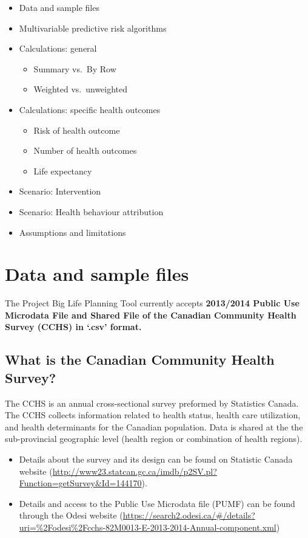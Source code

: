 \documentclass[]{book}
\providecommand{\tightlist}{%
  \setlength{\itemsep}{0pt}\setlength{\parskip}{0pt}}
\begin{document}
\begin{itemize}
\item
  Data and sample files
\item
  Multivariable predictive risk algorithms
\item
  Calculations: general

  \begin{itemize}
  \tightlist
  \item
    Summary vs.~By Row
  \item
    Weighted vs.~unweighted
  \end{itemize}
\item
  Calculations: specific health outcomes

  \begin{itemize}
  \tightlist
  \item
    Risk of health outcome
  \item
    Number of health outcomes
  \item
    Life expectancy
  \end{itemize}
\item
  Scenario: Intervention
\item
  Scenario: Health behaviour attribution
\item
  Assumptions and limitations
\end{itemize}

\section{Data and sample files}\label{data-and-sample-files}

The Project Big Life Planning Tool currently accepts \textbf{2013/2014
Public Use Microdata File and Shared File of the Canadian Community
Health Survey (CCHS) in `.csv' format.}

\subsection{What is the Canadian Community Health
Survey?}\label{what-is-the-canadian-community-health-survey}

The CCHS is an annual cross-sectional survey preformed by Statistics
Canada. The CCHS collects information related to health status, health
care utilization, and health determinants for the Canadian population.
Data is shared at the the sub-provincial geographic level (health region
or combination of health regions).

\begin{itemize}
\tightlist
\item
  Details about the survey and its design can be found on Statistic
  Canada website
  (\url{http://www23.statcan.gc.ca/imdb/p2SV.pl?Function=getSurvey\&Id=144170}).
\item
  Details and access to the Public Use Microdata file (PUMF) can be
  found through the Odesi website
  (\url{https://search2.odesi.ca/\#/details?uri=\%2Fodesi\%2Fcchs-82M0013-E-2013-2014-Annual-component.xml})
\end{itemize}
\end{document}
